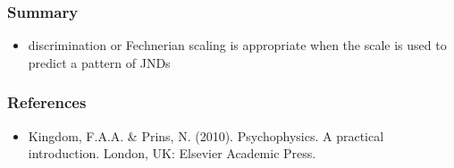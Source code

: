 \documentclass[]{beamer}
\begin{document}
\begin{frame}
 \frametitle{Summary}
\begin{itemize}
 \item discrimination or Fechnerian scaling is appropriate when the scale is used to predict a pattern of JNDs
\end{itemize}
\end{frame}


\begin{frame}
 \frametitle{References}
\begin{small}
\begin{itemize}
 \item  Kingdom, F.A.A. \& Prins, N. (2010). Psychophysics. A practical introduction. London, UK: Elsevier Academic Press.
\end{itemize}
\end{small}
\end{frame}
\end{document}
